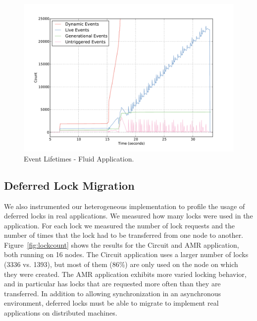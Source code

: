 \begin{figure}
\begin{center}
\includegraphics[scale=0.33]{figs/event_lifetimes.pdf}
\end{center}
\vspace{-6mm}
\caption{Event Lifetimes - Fluid Application.\label{fig:eventlife}}
\vspace{-4mm}
\end{figure}


\subsection{Deferred Lock Migration}
\label{subsec:lockmig}

We also instrumented our heterogeneous implementation to profile the usage of 
deferred locks in real applications.  We measured how many locks were used in the application.  For
each lock we measured the number of lock requests and the number of times that the lock
had to be transferred from one node to another.  Figure~\ref{fig:lockcount} shows the results 
for the Circuit and AMR application, both running on 16 nodes.  The Circuit application uses
a larger number of locks (3336 vs. 1393), but most of them (86\%) are only used on the node on 
which they were created.  The AMR application exhibits more varied locking behavior, and in 
particular has locks that are requested more often than they are transferred.  In addition
to allowing synchronization in an asynchronous environment, deferred locks must be able to 
migrate to implement real applications on distributed machines.

